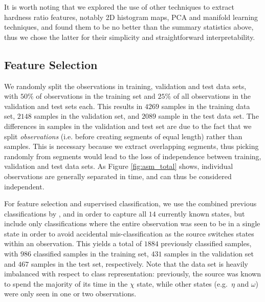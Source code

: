 \documentclass[12pt]{emulateapj}
\begin{document}
It is worth noting that we explored the use of other techniques to extract hardness ratio features, notably 2D histogram maps, PCA and manifold learning techniques, and found them to be no better than the summary statistics above, thus we chose the latter for their simplicity and straightforward interpretability. 


\subsection{Feature Selection}
\label{sec:featureselection}

We randomly split the observations in training, validation and test data sets, with $50\%$ of observations in the training set and $25\%$ of all observations in the validation and test sets each. This results in $4269$ samples in the training data set, $2148$ samples in the validation set, and $2089$ sample in the test data set.  The differences in samples in the validation and test set are due to the fact that we split \textit{observations} (i.e. before creating segments of equal length) rather than samples. This is necessary because we extract overlapping segments, thus picking randomly from segments would lead to the loss of independence between training, validation and test data sets. As Figure \ref{fig:asm_total} shows, individual observations are generally separated in time, and can thus be considered independent.

For feature selection and supervised classification, we use the combined previous classifications by \citet{belloni2000}, \citet{kleinwolt2002} and \citet{hannikainen2003} in order to capture all $14$ currently known states, but include only classifications where the entire observation was seen to be in a single state in order to avoid accidental mis-classification as the source switches states within an observation. This yields a total of $1884$ previously classified samples, with $986$ classified samples in the training set, $431$ samples in the validation set and $467$ samples in the test set, respectively. Note that the data set is heavily imbalanced with respect to class representation: previously, the source was known to spend the majority of its time in the $\chi$ state, while other states (e.g.\ $\eta$ and $\omega$) were only seen in one or two observations. 
\end{document}
